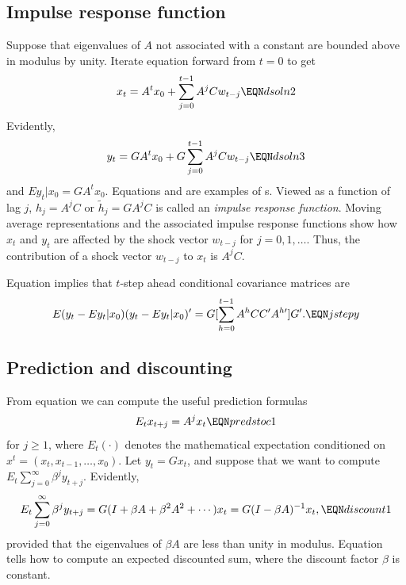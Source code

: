 %
\subsection{Impulse response function}
Suppose that  eigenvalues of $A$ not associated with
a constant are bounded above in modulus  by unity.  
Iterate equation  forward from
$t=0$ to get
$$ x_t = A^t x_0 + \sum_{j=0}^{t-1} A^j C w_{t-j}
  \EQN dsoln2 $$
Evidently, $$ y_t =G A^t x_0 + G\sum_{j=0}^{t-1} A^j C w_{t-j}
  \EQN dsoln3 $$
and $E y_t | x_0 = G A^t x_0$.
Equations %
  and 
 are examples of
 s.
Viewed as a function of lag $j$, $h_j = A^j C$  or $\tilde h_j = G
A^j C$  is called
an {\it impulse response function\/}.
%
  Moving average representations
and the associated impulse response functions show
how $x_{t}$ and $y_{t}$ are affected by
the shock vector $w_{t-j}$ for $j=0, 1, \ldots$.  Thus, the contribution of a shock vector
$w_{t-j}$ to $x_t$ is $A^jC$.

Equation  implies that  $t$-step ahead conditional covariance matrices
are
$$ E(y_t - E y_t | x_0)(y_t - E y_t | x_0)'
= G[ \sum_{h=0}^{t-1} A^h C C' A^{h \prime} ] G'. \EQN jstepy $$
 
\subsection{Prediction and discounting}
  From equation  we can compute the useful prediction formulas
$$ E_t x_{t+j} = A^j x_t \EQN predstoc1  $$
for $j \geq 1$, where $E_t(\cdot)$ denotes the mathematical
expectation conditioned on $x^t = (x_t, x_{t-1}, \ldots, x_0)$.
Let $y_t = G x_t$, and  suppose that we want to compute
$ E_t \sum_{j=0}^\infty \beta^j y_{t+j} $.
Evidently,
$$ E_t \sum_{j=0}^\infty \beta^j y_{t+j} = G(I + \beta A + \beta^2 A^2 + \cdots) x_t =  G(I -\beta A)^{-1} x_t,
\EQN discount1 $$
provided that the eigenvalues of $\beta A$ are less than
unity in modulus.  Equation  tells  how to compute
an expected discounted sum, where the discount factor $\beta$ is
constant.

